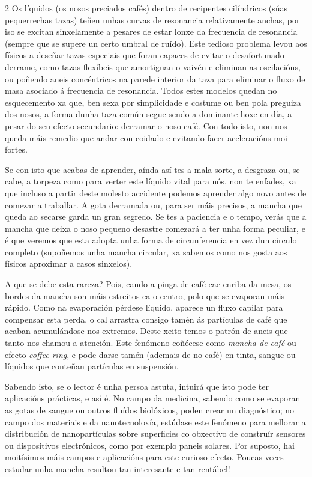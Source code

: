 \begin{multicols}{2}
Os líquidos (os nosos preciados cafés) dentro de recipentes cilíndricos (súas
pequerrechas tazas) teñen unhas curvas de resonancia relativamente anchas, por
iso se excitan sinxelamente a pesares de estar lonxe da frecuencia de resonancia
(sempre que se supere un certo umbral de ruído). Este tedioso problema levou
aos físicos a deseñar tazas especiais que foran capaces de evitar o
desafortunado derrame, como tazas flexíbeis que amortiguan o vaivén e eliminan
as oscilacións, ou poñendo aneis concéntricos na parede interior da taza para
eliminar o fluxo de masa asociado á frecuencia de resonancia. Todos estes
modelos quedan no esquecemento xa que, ben sexa por simplicidade e costume ou
ben pola preguiza dos nosos, a forma dunha taza común segue sendo a dominante
hoxe en día, a pesar do seu efecto secundario: derramar o noso café. Con todo
isto, non nos queda máis remedio que andar con coidado e evitando facer
aceleracións moi fortes.

Se con isto que acabas de aprender, aínda así tes a mala sorte, a desgraza ou,
se cabe, a torpeza como para verter este líquido vital para nós, non te
enfades, xa que incluso a partir deste molesto accidente podemos aprender algo
novo antes de comezar a traballar. A gota derramada ou, para ser máis precisos,
a mancha que queda ao secarse garda un gran segredo. Se tes a paciencia e o
tempo, verás que a mancha que deixa o noso pequeno desastre comezará a ter unha
forma peculiar, e é que veremos que esta adopta unha forma de circunferencia en
vez dun circulo completo (supoñemos unha mancha circular, xa sabemos como nos
gosta aos físicos aproximar a casos sinxelos).

A que se debe esta rareza? Pois, cando a pinga de café cae enriba da mesa, os bordes da mancha son máis
estreitos ca o centro, polo que se evaporan máis rápido. Como na evaporación
pérdese líquido, aparece un fluxo capilar para compensar esta perda, o cal
arrastra consigo tamén ás partículas de café que acaban acumulándose nos
extremos. Deste xeito temos o patrón de aneis que tanto nos chamou a atención.
Este fenómeno coñécese como \textit{mancha de café} ou efecto \textit{coffee
ring}, e pode darse tamén (ademais de no café) en tinta, sangue ou líquidos que
conteñan partículas en suspensión. 

Sabendo isto, se o lector é unha persoa astuta, intuirá que isto pode ter aplicacións prácticas, e así é. No campo da
medicina, sabendo como se evaporan as gotas de sangue ou outros fluídos
biolóxicos, poden crear un diagnóstico; no campo dos materiais e da
nanotecnoloxía, estúdase este fenómeno para mellorar a distribución de
nanopartículas sobre superficies co obxectivo de construír sensores ou
dispositivos electrónicos, como por exemplo paneis solares. Por suposto, hai
moitísimos máis campos e aplicacións para este curioso efecto. Poucas veces
estudar unha mancha resultou tan interesante e tan rentábel!


\end{multicols}

